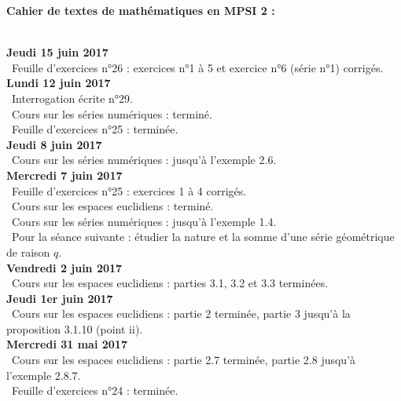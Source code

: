 \documentclass[12pt,a4paper]{article}
\begin{document}
\begin{center}
\Large\bf Cahier de textes de mathématiques en MPSI 2 :
\end{center}
\vspace{1cm}
\vspace{.4cm}\\

\noindent\textbf{Jeudi 15 juin 2017}\\
\bu\ Feuille d'exercices n°26 : exercices n°1 à 5 et exercice n°6 (série n°1) corrigés.\vspace{.4cm}\\

\noindent\textbf{Lundi 12 juin 2017}\\
\bu\ Interrogation écrite n°29.\\
\bu\ Cours sur les séries numériques : terminé.\\
\bu\ Feuille d'exercices n°25 : terminée.\vspace{.4cm}\\

\noindent\textbf{Jeudi 8 juin 2017}\\
\bu\ Cours sur les séries numériques : jusqu'à l'exemple 2.6.\vspace{.4cm}\\

\noindent\textbf{Mercredi 7 juin 2017}\\
\bu\ Feuille d'exercices n°25 : exercices 1 à 4 corrigés.\\
\bu\ Cours sur les espaces euclidiens : terminé.\\
\bu\ Cours sur les séries numériques : jusqu'à l'exemple 1.4.\\
\bu\ Pour la séance suivante : étudier la nature et la somme d'une série géométrique de raison $q$.\vspace{.4cm}\\

\noindent\textbf{Vendredi 2 juin 2017}\\
\bu\ Cours sur les espaces euclidiens : parties 3.1, 3.2 et 3.3 terminées.\vspace{.4cm}\\

\noindent\textbf{Jeudi 1er juin 2017}\\
\bu\ Cours sur les espaces euclidiens : partie 2 terminée, partie 3 jusqu'à la proposition 3.1.10 (point ii).\vspace{.4cm}\\

\noindent\textbf{Mercredi 31 mai 2017}\\
\bu\ Cours sur les espaces euclidiens : partie 2.7 terminée, partie 2.8 jusqu'à l'exemple 2.8.7.\\
\bu\ Feuille d'exercices n°24 : terminée.\vspace{.4cm}\\
\end{document}
